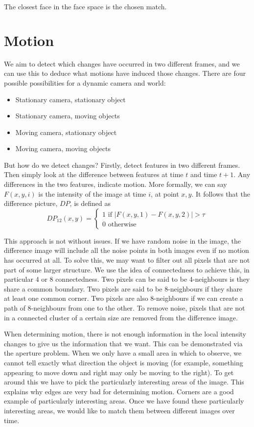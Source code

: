\documentclass{article}
\begin{document}
	The closest face in the face space is the chosen match.
	\section{Motion}
	We aim to detect which changes have occurred in two different frames, and we can use this to deduce what motions have induced those changes. There are four possible possibilities for a dynamic camera and world:
	\begin{itemize}
		\item Stationary camera, stationary object
		\item Stationary camera, moving objects
		\item Moving camera, stationary object
		\item Moving camera, moving objects
	\end{itemize}
	
	But how do we detect changes? Firstly, detect features in two different frames. Then simply look at the difference between features at time $t$ and time $t + 1$. Any differences in the two features, indicate motion. More formally, we can say $F(x, y, i)$ is the intensity of the image at time $i$, at point $x, y$. It follows that the difference picture, $DP$, is defined as 
	\[ DP_{12}(x, y) = \begin{cases}
		1 \text{ if } |F(x, y, 1) - F(x, y, 2)| > \tau \\
		0 \text{ otherwise}
		\end{cases} \]
		
	This approach is not without issues. If we have random noise in the image, the difference image will include all the noise points in both images even if no motion has occurred at all. To solve this, we may want to filter out all pixels that are not part of some larger structure. We use the idea of connectedness to achieve this, in particular 4 or 8 connectedness. Two pixels can be said to be 4-neighbours is they share a common boundary. Two pixels are said to be 8-neighbours if they share at least one common corner. Two pixels are also 8-neighbours if we can create a path of 8-neighbours from one to the other. To remove noise, pixels that are not in a connected cluster of a certain size are removed from the difference image.
	
	\par 
	When determining motion, there is not enough information in the local intensity changes to give us the information that we want. This can be demonstrated via the aperture problem. When we only have a small area in which to observe, we cannot tell exactly what direction the object is moving (for example, something appearing to move down and right may only be moving to the right). To get around this we have to pick the particularly interesting areas of the image. This explains why edges are very bad for determining motion. Corners are a good example of particularly interesting areas. Once we have found these particularly interesting areas, we would like to match them between different images over time.
	
\end{document}
